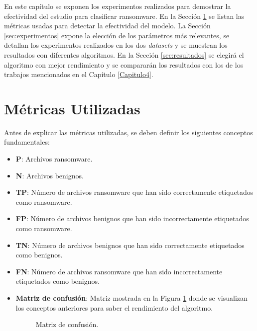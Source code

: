 \noindent En este capítulo se exponen los experimentos realizados para demostrar la efectividad del estudio para clasificar ransomware. En la Sección \ref{sec:metricas} se listan las métricas usadas para detectar la efectividad del modelo. La Sección \ref{sec:experimentos} expone la elección de los parámetros más relevantes, se detallan los experimentos realizados en los dos \textit{datasets} y se muestran los resultados con diferentes algoritmos. En la Sección \ref{sec:resultados} se elegirá el algoritmo con mejor rendimiento y se compararán los resultados con los de los trabajos mencionados en el Capítulo \ref{Capitulo4}.

\section{Métricas Utilizadas}\label{sec:metricas}

\noindent Antes de explicar las métricas utilizadas, se deben definir los siguientes conceptos fundamentales:
\begin{itemize}
    \item \textbf{P}: Archivos ransomware.
    \item \textbf{N}: Archivos benignos.
    \item \textbf{\gls{TP}}: Número de archivos ransomware que han sido correctamente etiquetados como ransomware.
    \item \textbf{\gls{FP}}: Número de archivos benignos que han sido incorrectamente etiquetados como ransomware.
    \item \textbf{\gls{TN}}: Número de archivos benignos que han sido correctamente etiquetados como benignos.
    \item \textbf{\gls{FN}}: Número de archivos ransomware que han sido incorrectamente etiquetados como benignos.
    \item \textbf{Matriz de confusión}: Matriz mostrada en la Figura \ref{fig:matrix} donde se visualizan los conceptos anteriores para saber el rendimiento del algoritmo.
    
    \begin{figure}[h!]
    \begin{center}
    {}
    \end{center}
    \caption{Matriz de confusión.}
    \label{fig:matrix} 
    \end{figure}
\end{itemize}

